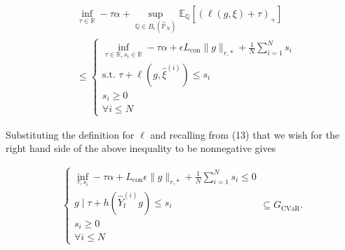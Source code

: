\documentclass[12pt, a4paper]{article}
\begin{document}
\begin{align}
    &\inf_{\tau \in \mathbb{R}} -\tau\alpha + \sup_{\mathbb{Q} \in B_\epsilon(\hat{\mathbb{P}}_N)} \mathbb{E}_\mathbb{Q}[(\ell(g,\xi) + \tau)_+] \\
    &\leq \begin{cases} 
        \inf_{\tau \in \mathbb{R}, s_i \in \mathbb{R}} -\tau\alpha + \epsilon L_\text{con}\|g\|_{r,*} + \frac{1}{N}\sum_{i=1}^N s_i \\
        \text{s.t. } \tau + \ell(g,\hat{\xi}^{(i)}) \leq s_i \\
        s_i \geq 0 \\
        \forall i \leq N
        \end{cases}
\end{align}

Substituting the definition for $\ell$ and recalling from (13) that we wish for the right hand side of the above inequality to be nonnegative gives

\begin{align}
    \begin{cases}
        \inf_{\tau,s_i} -\tau\alpha + L_\text{con}\epsilon\|g\|_{r,*} + \frac{1}{N}\sum_{i=1}^N s_i \leq 0 \\
        g \mid \tau + h(\hat{Y}_\text{f}^{(i)}g) \leq s_i \\
        s_i \geq 0 \\
        \forall i \leq N
        \end{cases} \subseteq G_\text{CVaR}.
\end{align}


 

\end{document}
